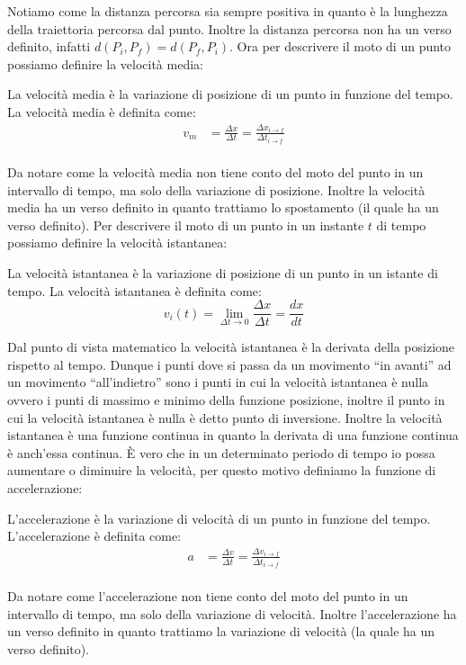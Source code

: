     Notiamo come la distanza percorsa sia sempre positiva in quanto è la lunghezza della traiettoria percorsa dal punto. Inoltre la distanza percorsa non ha un verso definito, infatti $d(P_i, P_f) = d(P_f, P_i)$.\newline
    Ora per descrivere il moto di un punto possiamo definire la velocità media:
    \begin{definition}
        La velocità media è la variazione di posizione di un punto in funzione del tempo. La velocità media è definita come:
        $$
            \begin{aligned}
                v_m &= \frac{\Delta x}{\Delta t} = \frac{\Delta x_{i \to f}}{\Delta t_{i \to f}}\\
            \end{aligned}
        $$
    \end{definition}
    Da notare come la velocità media non tiene conto del moto del punto in un intervallo di tempo, ma solo della variazione di posizione. Inoltre la velocità media ha un verso definito in quanto trattiamo lo spostamento (il quale ha un verso definito).\newline
    Per descrivere il moto di un punto in un instante $t$ di tempo possiamo definire la velocità istantanea:
    \begin{definition}
        La velocità istantanea è la variazione di posizione di un punto in un istante di tempo. La velocità istantanea è definita come:
        $$
            v_i(t)=\lim\limits_{\Delta t \to 0} \frac{\Delta x}{\Delta t} = \frac{dx}{dt}
        $$
    \end{definition}
    Dal punto di vista matematico la velocità istantanea è la derivata della posizione rispetto al tempo. Dunque i punti dove si passa da un movimento ``in avanti'' ad un movimento ``all'indietro'' sono i punti in cui la velocità istantanea è nulla ovvero i punti di massimo e minimo della funzione posizione, inoltre il punto in cui la velocità istantanea è nulla è detto punto di inversione. Inoltre la velocità istantanea è una funzione continua in quanto la derivata di una funzione continua è anch'essa continua.\newline
    È vero che in un determinato periodo di tempo io possa aumentare o diminuire la velocità, per questo motivo definiamo la funzione di accelerazione:
    \begin{definition}[Accelerazione]
        L'accelerazione è la variazione di velocità di un punto in funzione del tempo. L'accelerazione è definita come:
        $$
            \begin{aligned}
                a &= \frac{\Delta v}{\Delta t} = \frac{\Delta v_{i \to f}}{\Delta t_{i \to f}}\\
            \end{aligned}
        $$
    \end{definition}
    Da notare come l'accelerazione non tiene conto del moto del punto in un intervallo di tempo, ma solo della variazione di velocità. Inoltre l'accelerazione ha un verso definito in quanto trattiamo la variazione di velocità (la quale ha un verso definito).
